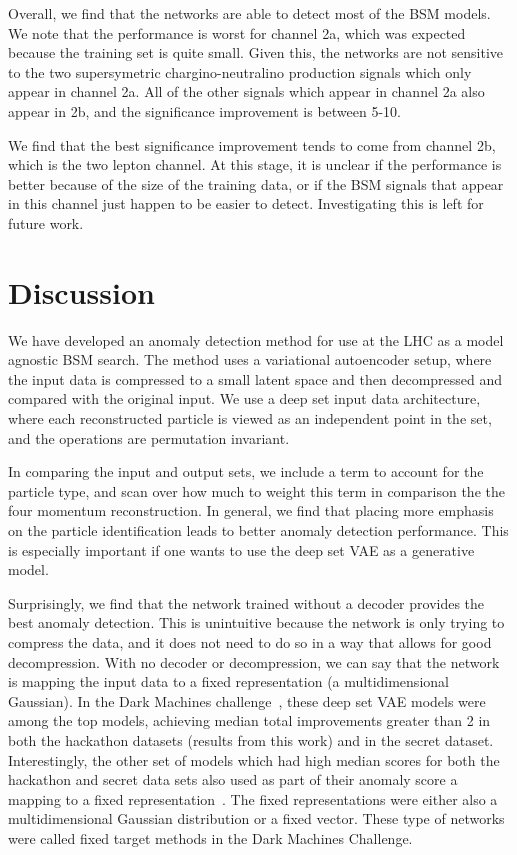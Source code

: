 \documentclass[submission, Phys]{SciPost}
\begin{document}
Overall, we find that the networks are able to detect most of the BSM models.
We note that the performance is worst for channel 2a, which was expected because the training set is quite small.
Given this, the networks are not sensitive to the two supersymetric chargino-neutralino production signals which only appear in channel 2a.
All of the other signals which appear in channel 2a also appear in 2b, and the significance improvement is between 5-10.

We find that the best significance improvement tends to come from channel 2b, which is the two lepton channel.
At this stage, it is unclear if the performance is better because of the size of the training data, or if the BSM signals that appear in this channel just happen to be easier to detect.
Investigating this is left for future work.

\section{Discussion}
\label{sec:Discussion}

We have developed an anomaly detection method for use at the LHC as a model agnostic BSM search.
The method uses a variational autoencoder setup, where the input data is compressed to a small latent space and then decompressed and compared with the original input.
We use a deep set input data architecture, where each reconstructed particle is viewed as an independent point in the set, and the operations are permutation invariant.

In comparing the input and output sets, we include a term to account for the particle type, and scan over how much to weight this term in comparison the the four momentum reconstruction.
In general, we find that placing more emphasis on the particle identification leads to better anomaly detection performance.
This is especially important if one wants to use the deep set VAE as a generative model.

Surprisingly, we find that the network trained without a decoder provides the best anomaly detection.
This is unintuitive because the network is only trying to compress the data, and it does not need to do so in a way that allows for good decompression.
With no decoder or decompression, we can say that the network is mapping the input data to a fixed representation (a multidimensional Gaussian).
In the Dark Machines challenge~\cite{Aarrestad:2021oeb}, these deep set VAE models were among the top models, achieving median total improvements greater than 2 in both the hackathon datasets (results from this work) and in the secret dataset.
Interestingly, the other set of models which had high median scores for both the hackathon and secret data sets also used as part of their anomaly score a mapping to a fixed representation~\cite{Caron:2021wmq}.
The fixed representations were either also a multidimensional Gaussian distribution or a fixed vector.
These type of networks were called fixed target methods in the Dark Machines Challenge.
\end{document}
